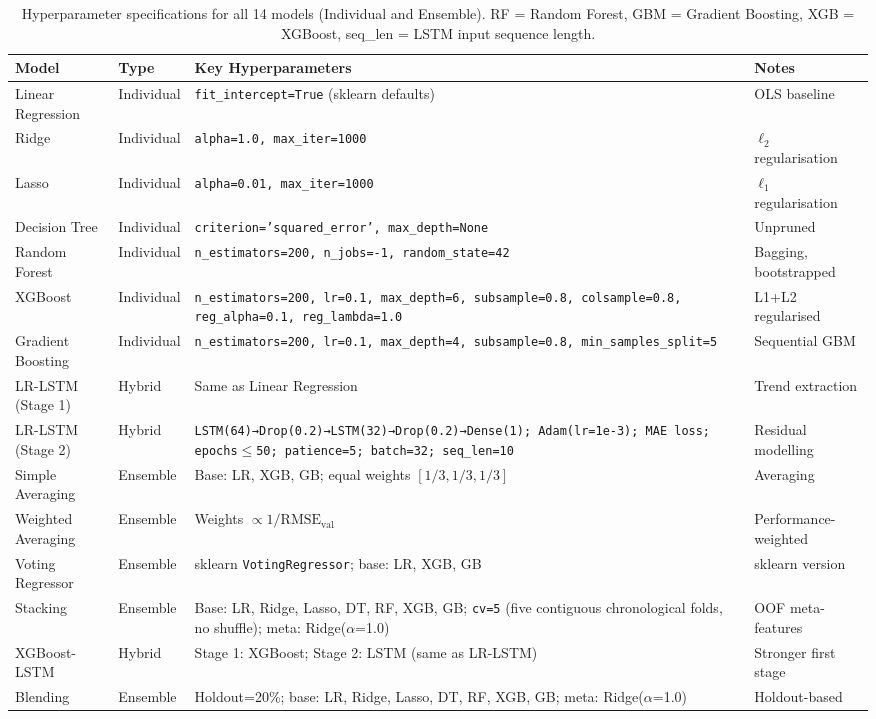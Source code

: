 \documentclass[a4paper,fleqn]{cas-dc}
\begin{document}
\begin{table}[t]
\centering
\caption{Hyperparameter specifications for all 14 models (Individual and Ensemble). RF = Random Forest, GBM = Gradient Boosting, XGB = XGBoost, seq\_len = LSTM input sequence length.\label{tab:hyperparams}}
\small
\begin{tabular}{@{}p{3.2cm}p{1.6cm}p{7.6cm}p{2.8cm}@{}}
\toprule
\textbf{Model} & \textbf{Type} & \textbf{Key Hyperparameters} & \textbf{Notes} \\
\toprule
Linear Regression & Individual & \texttt{fit\_intercept=True} (sklearn defaults) & OLS baseline \\
Ridge & Individual & \texttt{alpha=1.0, max\_iter=1000} & $\ell_2$ regularisation \\
Lasso & Individual & \texttt{alpha=0.01, max\_iter=1000} & $\ell_1$ regularisation \\
Decision Tree & Individual & \texttt{criterion='squared\_error', max\_depth=None} & Unpruned \\
Random Forest & Individual & \texttt{n\_estimators=200, n\_jobs=-1, random\_state=42} & Bagging, bootstrapped \\
XGBoost & Individual & \texttt{n\_estimators=200, lr=0.1, max\_depth=6, subsample=0.8, colsample=0.8, reg\_alpha=0.1, reg\_lambda=1.0} & L1+L2 regularised \\
Gradient Boosting & Individual & \texttt{n\_estimators=200, lr=0.1, max\_depth=4, subsample=0.8, min\_samples\_split=5} & Sequential GBM \\
LR-LSTM (Stage 1) & Hybrid & Same as Linear Regression & Trend extraction \\
LR-LSTM (Stage 2) & Hybrid & \texttt{LSTM(64)→Drop(0.2)→LSTM(32)→Drop(0.2)→Dense(1); Adam(lr=1e-3); MAE loss; epochs$\le$50; patience=5; batch=32; seq\_len=10} & Residual modelling \\
Simple Averaging & Ensemble & Base: LR, XGB, GB; equal weights $[1/3,1/3,1/3]$ & Averaging \\
Weighted Averaging & Ensemble & Weights $\propto 1/\text{RMSE}_{\text{val}}$ & Performance-weighted \\
Voting Regressor & Ensemble & sklearn \texttt{VotingRegressor}; base: LR, XGB, GB & sklearn version \\
Stacking & Ensemble & Base: LR, Ridge, Lasso, DT, RF, XGB, GB; \texttt{cv=5} (five contiguous chronological folds, no shuffle); meta: Ridge($\alpha$=1.0) & OOF meta-features \\
XGBoost-LSTM & Hybrid & Stage 1: XGBoost; Stage 2: LSTM (same as LR-LSTM) & Stronger first stage \\
Blending & Ensemble & Holdout=20\%; base: LR, Ridge, Lasso, DT, RF, XGB, GB; meta: Ridge($\alpha$=1.0) & Holdout-based \\
\bottomrule
\end{tabular}
\end{table}
\end{document}
